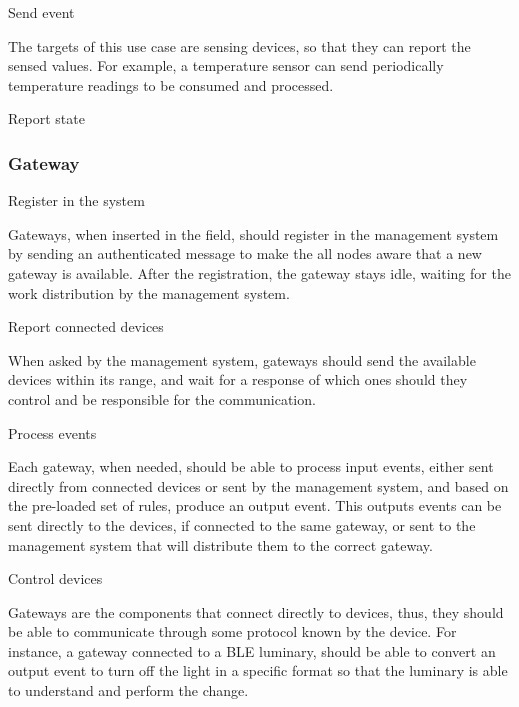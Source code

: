\begin{Paragraph}{Send event} %
	
The targets of this use case are sensing devices, so that they can report the sensed values. For example, a temperature sensor can send periodically temperature readings to be consumed and processed.
	
\end{Paragraph}

\begin{Paragraph}{Report state}
	

	
\end{Paragraph}

\subsubsection{Gateway}
\begin{Paragraph}{Register in the system}
	
Gateways, when inserted in the field, should register in the management system by sending an authenticated message to make the all nodes aware that a new gateway is available. After the registration, the gateway stays idle, waiting for the work distribution by the management system.
	
\end{Paragraph}

\begin{Paragraph}{Report connected devices}
	
When asked by the management system, gateways should send the available devices within its range, and wait for a response of which ones should they control and be responsible for the communication. 
	
\end{Paragraph}

\begin{Paragraph}{Process events}
	
Each gateway, when needed, should be able to process input events, either sent directly from connected devices or sent by the management system, and based on the pre-loaded set of rules, produce an output event. This outputs events can be sent directly to the devices, if connected to the same gateway, or sent to the management system that will distribute them to the correct gateway.

\end{Paragraph}

\begin{Paragraph}{Control devices}
	
Gateways are the components that connect directly to devices, thus, they should be able to communicate through some protocol known by the device. For instance, a gateway connected to a BLE luminary, should be able to convert an output event to turn off the light in a specific format so that the luminary is able to understand and perform the change.
	
\end{Paragraph}

